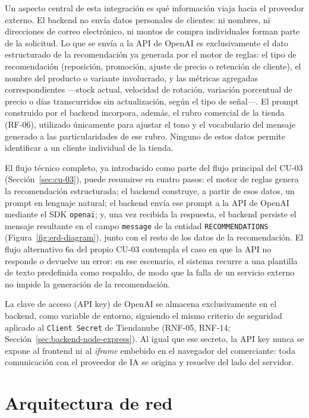 Un aspecto central de esta integración es qué información viaja hacia el proveedor externo. El backend no envía datos personales de clientes: ni nombres, ni direcciones de correo electrónico, ni montos de compra individuales forman parte de la solicitud. Lo que se envía a la API de OpenAI es exclusivamente el dato estructurado de la recomendación ya generada por el motor de reglas: el tipo de recomendación (reposición, promoción, ajuste de precio o retención de cliente), el nombre del producto o variante involucrado, y las métricas agregadas correspondientes ---stock actual, velocidad de rotación, variación porcentual de precio o días transcurridos sin actualización, según el tipo de señal---. El prompt construido por el backend incorpora, además, el rubro comercial de la tienda (RF-06), utilizado únicamente para ajustar el tono y el vocabulario del mensaje generado a las particularidades de ese rubro. Ninguno de estos datos permite identificar a un cliente individual de la tienda.

El flujo técnico completo, ya introducido como parte del flujo principal del CU-03 (Sección~\ref{sec:cu-03}), puede resumirse en cuatro pasos: el motor de reglas genera la recomendación estructurada; el backend construye, a partir de esos datos, un prompt en lenguaje natural; el backend envía ese prompt a la API de OpenAI mediante el SDK \texttt{openai}; y, una vez recibida la respuesta, el backend persiste el mensaje resultante en el campo \texttt{message} de la entidad \texttt{RECOMMENDATIONS} (Figura~\ref{fig:erd-diagram}), junto con el resto de los datos de la recomendación. El flujo alternativo 6a del propio CU-03 contempla el caso en que la API no responde o devuelve un error: en ese escenario, el sistema recurre a una plantilla de texto predefinida como respaldo, de modo que la falla de un servicio externo no impide la generación de la recomendación.

La clave de acceso (API key) de OpenAI se almacena exclusivamente en el backend, como variable de entorno, siguiendo el mismo criterio de seguridad aplicado al \texttt{Client Secret} de Tiendanube (RNF-05, RNF-14; Sección~\ref{sec:backend-node-express}). Al igual que ese secreto, la API key nunca se expone al frontend ni al \emph{iframe} embebido en el navegador del comerciante: toda comunicación con el proveedor de IA se origina y resuelve del lado del servidor.

\section{Arquitectura de red}
\label{sec:arquitectura-red}

